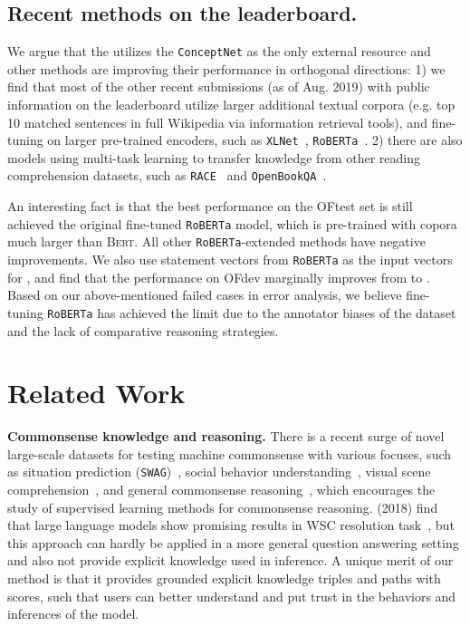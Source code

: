 \documentclass[11pt,a4paper]{article}
\begin{document}
\subsection{Recent methods on the leaderboard.}
We argue that the \KagNet utilizes the \texttt{ConceptNet} as the only external resource and other methods are improving their performance in orthogonal directions:
1) we find that most of the other recent submissions (as of Aug. 2019) with public information on the leaderboard utilize larger additional textual corpora (e.g. top 10 matched sentences in full Wikipedia via information retrieval tools), and fine-tuning on larger pre-trained encoders, such as \texttt{XLNet}~\cite{Yang2019XLNetGA}, \texttt{RoBERTa}~\cite{Liu2019RoBERTaAR}.
2) there are also models using multi-task learning to transfer knowledge from other reading comprehension datasets, such as \texttt{RACE}~\cite{Lai2017RACELR} and \texttt{OpenBookQA}~\cite{Mihaylov2018CanAS}.

An interesting fact is that the best performance on the OFtest set is still achieved the original fine-tuned \texttt{RoBERTa} model, which is pre-trained with copora much larger than \textsc{Bert}. 
All other \texttt{RoBERTa}-extended methods have negative improvements. 
We also use statement vectors from \texttt{RoBERTa} as the input vectors for \KagNet, and find that the performance on OFdev marginally improves from  to . 
Based on our above-mentioned failed cases in error analysis, we believe fine-tuning \texttt{RoBERTa} has achieved the limit due to the annotator biases of the dataset and the lack of comparative reasoning strategies.



\section{Related Work}
\noindent
\textbf{Commonsense knowledge and reasoning.}  
There is a recent surge of novel large-scale datasets for testing machine commonsense with various focuses,
such as situation prediction (\texttt{SWAG})~\cite{Zellers2018SWAGAL}, social behavior understanding~\cite{sap2018atomic, Sap2019SocialIQACR}, visual scene comprehension~\cite{Zellers2019FromRT}, and general commonsense reasoning~\cite{Talmor2018CommonsenseQAAQ},
which encourages the study of supervised learning methods for commonsense reasoning. 
\citeauthor{Trinh2018ASM} (2018) find that large language models show promising results in WSC resolution task~\cite{Levesque2011TheWS}, but this approach can hardly be applied in a more general question answering setting and also not provide explicit knowledge used in inference.
A unique merit of our \KagNet method is that it provides grounded explicit knowledge triples and paths with scores, such that users can better understand and put trust in the behaviors and inferences of the model.
\end{document}

